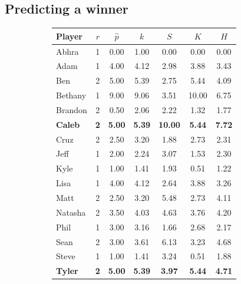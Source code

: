\documentclass[letterpaper, 10 pt, conference]{ieeeconf}  %
\begin{document}
\subsection{Predicting a winner}
\begin{figure}
        \centering
        \begin{subfigure}[hb]{0.4\textwidth}
                \footnotesize
                \centering
                \begin{tabular}{lccc|ccc}
                        Player	&	$r$	&	$\hat{p}$	&	$k$	&	$S$	&	$K$	&	$H$	\\
                        \midrule													
                        Abhra	&	1	&	0.00	&	1.00	&	0.00	&	0.00	&	0.00	\\
                        Adam	&	1	&	4.00	&	4.12	&	2.98	&	3.88	&	3.43	\\
                        Ben	&	2	&	5.00	&	5.39	&	2.75	&	5.44	&	4.09	\\
                        Bethany	&	1	&	9.00	&	9.06	&	3.51	&	10.00	&	6.75	\\
                        Brandon	&	2	&	0.50	&	2.06	&	2.22	&	1.32	&	1.77	\\
                        \textbf{Caleb}	&	\textbf{2}	&	\textbf{5.00}	&	\textbf{5.39}	&	\textbf{10.00}	&	\textbf{5.44}	&	\textbf{7.72}	\\
                        Cruz	&	2	&	2.50	&	3.20	&	1.88	&	2.73	&	2.31	\\
                        Jeff	&	1	&	2.00	&	2.24	&	3.07	&	1.53	&	2.30	\\
                        Kyle	&	1	&	1.00	&	1.41	&	1.93	&	0.51	&	1.22	\\
                        Lisa	&	1	&	4.00	&	4.12	&	2.64	&	3.88	&	3.26	\\
                        Matt	&	2	&	2.50	&	3.20	&	5.48	&	2.73	&	4.11	\\
                        Natasha	&	2	&	3.50	&	4.03	&	4.63	&	3.76	&	4.20	\\
                        Phil	&	1	&	3.00	&	3.16	&	1.66	&	2.68	&	2.17	\\
                        Sean	&	2	&	3.00	&	3.61	&	6.13	&	3.23	&	4.68	\\
                        Steve	&	1	&	1.00	&	1.41	&	3.24	&	0.51	&	1.88	\\
                        \textbf{Tyler}	&	\textbf{2}	&	\textbf{5.00}	&	\textbf{5.39}	&	\textbf{3.97}	&	\textbf{5.44}	&	\textbf{4.71}	\\
                \end{tabular}

\end{subfigure}
\end{figure}
\end{document}
